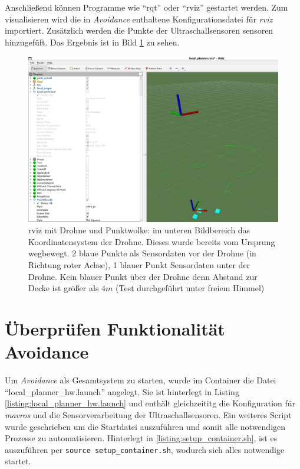 Anschließend können Programme wie \enquote{rqt} oder \enquote{rviz}\cite[Kapitel 5.2ff]{markusreinErweiterungBestehenderDrohnen2023} gestartet werden.\newline
Zum visualisieren wird die in \textit{Avoidance} enthaltene Konfigurationsdatei für \textit{rviz} importiert. Zusätzlich werden die Punkte der Ultraschallsensoren sensoren hinzugefüft. Das Ergebnis ist in Bild \ref{fig:avoid_plan_sensors} zu sehen.

\begin{figure}[!ht]
    \centering
    \includegraphics[width=0.7\linewidth]{images/avoid_plan_sensors.png}
    \caption[rviz mit Drohne und Punktwolke]{rviz mit Drohne und Punktwolke: im unteren Bildbereich das Koordinatensystem der Drohne. Dieses wurde bereits vom Ursprung wegbewegt. 2 blaue Punkte als Sensordaten vor der Drohne (in Richtung roter Achse), 1 blauer Punkt Sensordaten unter der Drohne. Kein blauer Punkt über der Drohne denn Abstand zur Decke ist größer als $4m$ (Test durchgeführt unter freiem Himmel)}
    \label{fig:avoid_plan_sensors}
\end{figure}

\section{Überprüfen Funktionalität Avoidance}
Um \textit{Avoidance} als Gesamtsystem zu starten, wurde im Container die Datei \enquote{local\_planner\_hw.launch} angelegt. Sie ist hinterlegt in Listing \ref{listing:local_planner_hw.launch} und enthält gleichzeititg die Konfiguration für \textit{mavros} und die Sensorverarbeitung der Ultraschallsensoren. Ein weiteres Script wurde geschrieben um die Startdatei auszuführen und somit alle notwendigen Prozesse zu automatisieren. Hinterlegt in \ref{listing:setup_container.sh}, ist es auszuführen per \texttt{source setup\_container.sh}, wodurch sich alles notwendige startet.\newline

